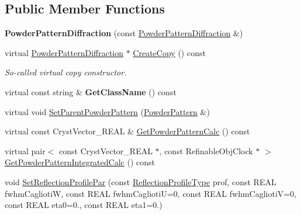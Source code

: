 \subsection*{Public Member Functions}
\begin{DoxyCompactItemize}
\item 
\mbox{\label{class_obj_cryst_1_1_powder_pattern_diffraction_a66a5dbb3c4a169bea2fd738b8e2ad4b1}} 
{\bfseries Powder\+Pattern\+Diffraction} (const \mbox{\hyperlink{class_obj_cryst_1_1_powder_pattern_diffraction}{Powder\+Pattern\+Diffraction}} \&)
\item 
\mbox{\label{class_obj_cryst_1_1_powder_pattern_diffraction_abfa0fdcb010e2bfc93dd958b6ad8e9bd}} 
virtual \mbox{\hyperlink{class_obj_cryst_1_1_powder_pattern_diffraction}{Powder\+Pattern\+Diffraction}} $\ast$ \mbox{\hyperlink{class_obj_cryst_1_1_powder_pattern_diffraction_abfa0fdcb010e2bfc93dd958b6ad8e9bd}{Create\+Copy}} () const
\begin{DoxyCompactList}\small\item\em So-\/called virtual copy constructor. \end{DoxyCompactList}\item 
\mbox{\label{class_obj_cryst_1_1_powder_pattern_diffraction_aafd198402d5a2fdb6c53ae6d4628f621}} 
virtual const string \& {\bfseries Get\+Class\+Name} () const
\item 
virtual void \mbox{\hyperlink{class_obj_cryst_1_1_powder_pattern_diffraction_ab72aa94beafb9f7081c0cc5e9adc7050}{Set\+Parent\+Powder\+Pattern}} (\mbox{\hyperlink{class_obj_cryst_1_1_powder_pattern}{Powder\+Pattern}} \&)
\item 
virtual const Cryst\+Vector\+\_\+\+R\+E\+AL \& \mbox{\hyperlink{class_obj_cryst_1_1_powder_pattern_diffraction_a29b64d9d3d36eff816bd6dd2ce61a3c7}{Get\+Powder\+Pattern\+Calc}} () const
\item 
virtual pair$<$ const Cryst\+Vector\+\_\+\+R\+E\+AL $\ast$, const Refinable\+Obj\+Clock $\ast$ $>$ \mbox{\hyperlink{class_obj_cryst_1_1_powder_pattern_diffraction_a2c6ee9bfa4ac1518bd0fcd70cbb5cb72}{Get\+Powder\+Pattern\+Integrated\+Calc}} () const
\item 
void \mbox{\hyperlink{class_obj_cryst_1_1_powder_pattern_diffraction_a7e75337a21cc715aefb78ed70d30dba7}{Set\+Reflection\+Profile\+Par}} (const \mbox{\hyperlink{namespace_obj_cryst_a0997f99fe92ed00498e2ed57d51b8aad}{Reflection\+Profile\+Type}} prof, const R\+E\+AL fwhm\+CagliotiW, const R\+E\+AL fwhm\+CagliotiU=0, const R\+E\+AL fwhm\+CagliotiV=0, const R\+E\+AL eta0=0., const R\+E\+AL eta1=0.)

\end{DoxyCompactItemize}
